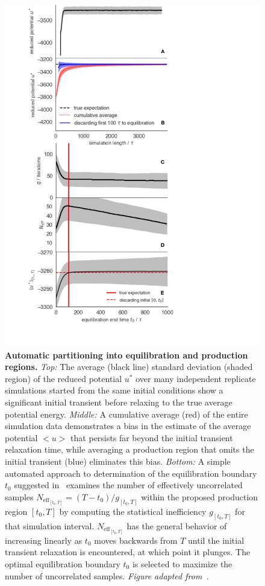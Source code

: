 \documentclass[9pt,bestpractices]{livecoms}
\begin{document}
\begin{figure}
    \centering
    \includegraphics[width=0.95\linewidth]{figures/fig11_equib_detection/Figure.pdf}
    \caption{{\bf Automatic partitioning into equilibration and production regions.}
    \emph{Top:} The average (black line) standard deviation (shaded region) of the reduced potential $u^*$ over many independent replicate simulations started from the same initial conditions show a significant initial transient before relaxing to the true average potential energy.
    \emph{Middle:} A cumulative average (red) of the entire simulation data demonstrates a bias in the estimate of the average potential $<u>$ that persists far beyond the initial transient relaxation time, while averaging a production region that omits the initial transient (blue) eliminates this bias.
    \emph{Bottom:} A simple automated approach to determination of the equilibration boundary $t_0$ suggested in~\cite{chodera2016simple} examines the number of effectively uncorrelated samples $N_{\mathrm{eff}_{[t_0,T]}} = (T-t_0) / g_{[t_0,T]}$ within the proposed production region $[t_0,T]$ by computing the statistical inefficiency $g_{[t_0,T]}$ for that simulation interval.
    $N_{\mathrm{eff}_{[t_0,T]}}$ has the general behavior of increasing linearly as $t_0$ moves backwards from $T$ until the initial transient relaxation is encountered, at which point it plunges.
    The optimal equilibration boundary $t_0$ is selected to maximize the number of uncorrelated samples.
    \emph{Figure adapted from~\cite{chodera2016simple}.}
    }
    \label{fig:automatic-equilibration-detection}
\end{figure}
\end{document}
